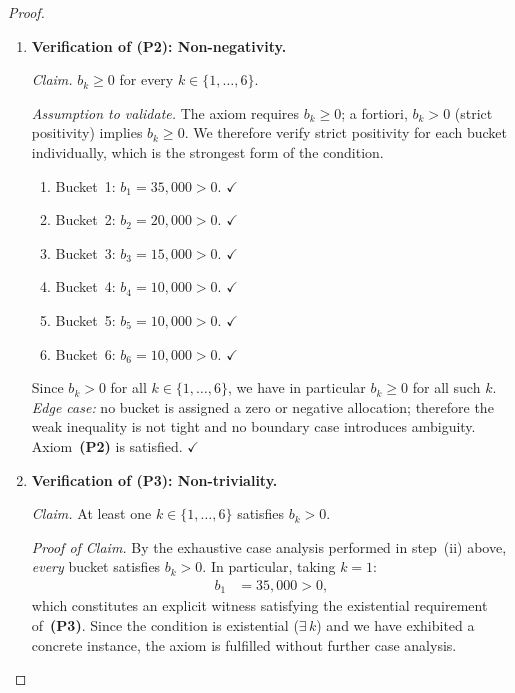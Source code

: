 \documentclass[12pt,openany]{book}
\numberwithin{equation}{chapter}
\theoremstyle{plain}
\theoremstyle{definition}
\theoremstyle{remark}
\numberwithin{equation}{chapter}
\theoremstyle{plain}
\begin{document}
\begin{proof}
\begin{enumerate}
        \noindent
        \textit{Boundary check.}  The empty-sum case ($k=0$ terms)
        yields $S_0 = 0 \leq W_0$, which is consistent; the
        single-step extension to $k=6$ yields equality as shown.
        Axiom~\textbf{(P1)} is satisfied. \hfill$\checkmark$

  \item \textbf{Verification of (P2): Non-negativity.}

        \smallskip
        \noindent
        \textit{Claim.} $b_k \geq 0$ for every $k \in \{1,\ldots,6\}$.

        \smallskip
        \noindent
        \textit{Assumption to validate.}  The axiom requires
        $b_k \geq 0$; a fortiori, $b_k > 0$ (strict positivity)
        implies $b_k \geq 0$.  We therefore verify strict positivity
        for each bucket individually, which is the strongest form
        of the condition.

        \begin{enumerate}
          \item Bucket~1: $b_1 = 35{,}000 > 0$. \hfill$\checkmark$
          \item Bucket~2: $b_2 = 20{,}000 > 0$. \hfill$\checkmark$
          \item Bucket~3: $b_3 = 15{,}000 > 0$. \hfill$\checkmark$
          \item Bucket~4: $b_4 = 10{,}000 > 0$. \hfill$\checkmark$
          \item Bucket~5: $b_5 = 10{,}000 > 0$. \hfill$\checkmark$
          \item Bucket~6: $b_6 = 10{,}000 > 0$. \hfill$\checkmark$
        \end{enumerate}

        \noindent
        Since $b_k > 0$ for all $k \in \{1,\ldots,6\}$, we have in
        particular $b_k \geq 0$ for all such $k$.  \textit{Edge case:}
        no bucket is assigned a zero or negative allocation; therefore
        the weak inequality is not tight and no boundary case
        introduces ambiguity.
        Axiom~\textbf{(P2)} is satisfied. \hfill$\checkmark$

  \item \textbf{Verification of (P3): Non-triviality.}

        \smallskip
        \noindent
        \textit{Claim.} At least one $k \in \{1,\ldots,6\}$ satisfies
        $b_k > 0$.

        \smallskip
        \noindent
        \textit{Proof of Claim.}
        By the exhaustive case analysis performed in step~(ii) above,
        \emph{every} bucket satisfies $b_k > 0$.  In particular,
        taking $k = 1$:
        \begin{align}
          b_1 &= 35{,}000 > 0,
        \end{align}
        which constitutes an explicit witness satisfying the
        existential requirement of~\textbf{(P3)}.  Since the
        condition is existential ($\exists\, k$) and we have
        exhibited a concrete instance, the axiom is fulfilled
        without further case analysis.


\end{enumerate}
\end{proof}
\end{document}
